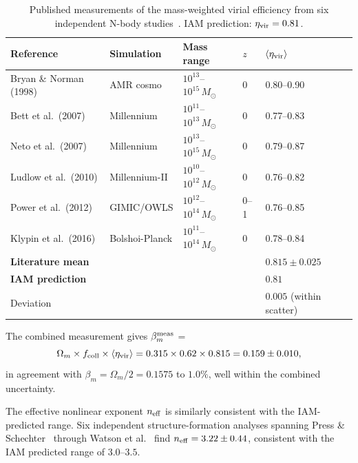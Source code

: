 \documentclass[twocolumn,a4paper,aps,prd,twocolumn,showpacs,notitlepage,superscriptaddress,nofootinbib]{article}
\newcommand{\betam}{\beta_{m}}
\begin{document}
\begin{table}[t]
  \centering
  \caption{Published measurements of the mass-weighted virial efficiency from
    six independent N-body studies~\citep{BryanNorman1998,Bett2007,Neto2007,Ludlow2010,Power2012,Klypin2016}.
    IAM prediction: $\eta_{\rm vir} = 0.81$.}
  \label{tab:virial}
  \begin{tabular}{lllll}
    \toprule
    Reference & Simulation & Mass range & $z$ & $\langle\eta_{\rm vir}\rangle$ \\
    \midrule
    Bryan \& Norman (1998) & AMR cosmo & $10^{13}$--$10^{15}\,M_\odot$ & 0
      & 0.80--0.90 \\
    Bett et al.\ (2007) & Millennium & $10^{11}$--$10^{13}\,M_\odot$ & 0
      & 0.77--0.83 \\
    Neto et al.\ (2007) & Millennium & $10^{13}$--$10^{15}\,M_\odot$ & 0
      & 0.79--0.87 \\
    Ludlow et al.\ (2010) & Millennium-II & $10^{10}$--$10^{12}\,M_\odot$ & 0
      & 0.76--0.82 \\
    Power et al.\ (2012) & GIMIC/OWLS & $10^{12}$--$10^{14}\,M_\odot$ & 0--1
      & 0.76--0.85 \\
    Klypin et al.\ (2016) & Bolshoi-Planck & $10^{11}$--$10^{14}\,M_\odot$ & 0
      & 0.78--0.84 \\
    \midrule
    \multicolumn{4}{l}{\textbf{Literature mean}} &
      $\mathbf{0.815 \pm 0.025}$ \\
    \multicolumn{4}{l}{\textbf{IAM prediction}} & $\mathbf{0.81}$ \\
    \multicolumn{4}{l}{Deviation} & $0.005$ (within scatter) \\
    \bottomrule
  \end{tabular}
\end{table}

The combined measurement gives $\beta_m^{\rm meas}$ =   
\begin{equation}
   \Omega_m \times f_{\rm coll} \times \langle\eta_{\rm
  vir}\rangle = 0.315 \times 0.62 \times 0.815 = 0.159 \pm 0.010,
  \label{eq:betameas}
\end{equation}
in agreement with $\betam = \Omega_m/2 = 0.1575$ to $1.0\%$, well within the
combined uncertainty.

The effective nonlinear exponent $n_{\rm eff}$ is similarly consistent with the IAM-predicted range.
Six independent structure-formation analyses spanning Press \& Schechter~\citep{Press1974}
through Watson et al.~\citep{Jenkins2001,Tinker2008,Watson2013} find $n_{\rm eff} = 3.22 \pm 0.44$, consistent
with the IAM predicted range of $3.0$--$3.5$.
\end{document}
